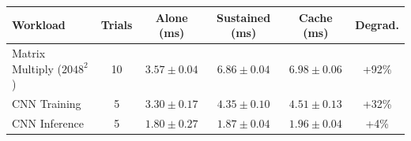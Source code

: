 \begin{tabular}{lccccc}
\toprule
Workload & Trials & Alone (ms) & Sustained (ms) & Cache (ms) & Degrad. \\
\midrule
Matrix Multiply ($2048^2$) & 10 & $3.57 \pm 0.04$ & $6.86 \pm 0.04$ & $6.98 \pm 0.06$ & +92\% \\
CNN Training & 5 & $3.30 \pm 0.17$ & $4.35 \pm 0.10$ & $4.51 \pm 0.13$ & +32\% \\
CNN Inference & 5 & $1.80 \pm 0.27$ & $1.87 \pm 0.04$ & $1.96 \pm 0.04$ & +4\% \\
\bottomrule
\end{tabular}
